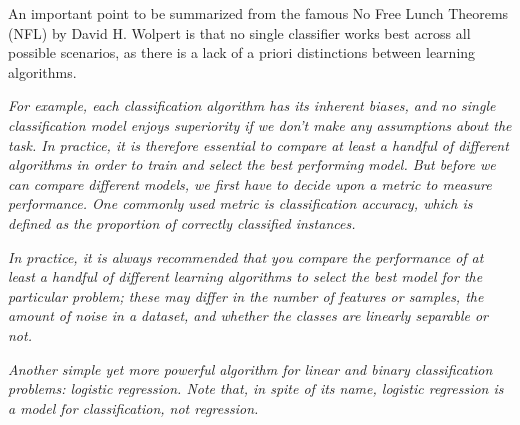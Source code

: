 An important point to be summarized from the famous No Free Lunch Theorems (NFL)\cite{Wolpert1996,Wolpert1997} by David H. Wolpert is that no single classifier works best across all possible scenarios, as there is a lack of a priori distinctions between learning algorithms.

\textit{For example, each classification algorithm has its inherent biases, and no single classification model enjoys superiority if we don't make any assumptions about the task. In practice, it is therefore essential to compare at least a handful of different algorithms in order to train and select the best performing model. But before we can compare different models, we first have to decide upon a metric to measure performance. One commonly used metric is classification accuracy, which is defined as the proportion of correctly classified instances.}

\textit{In practice, it is always recommended that you compare the performance of at least a handful of different learning algorithms to select the best model for the particular problem; these may differ in the number of features or samples, the amount of noise in a dataset, and whether the classes are linearly separable or not.}


\textit{Another simple yet more powerful algorithm for linear and binary classification problems: logistic regression. Note that, in spite of its name, logistic regression is a model for classification, not regression.}


